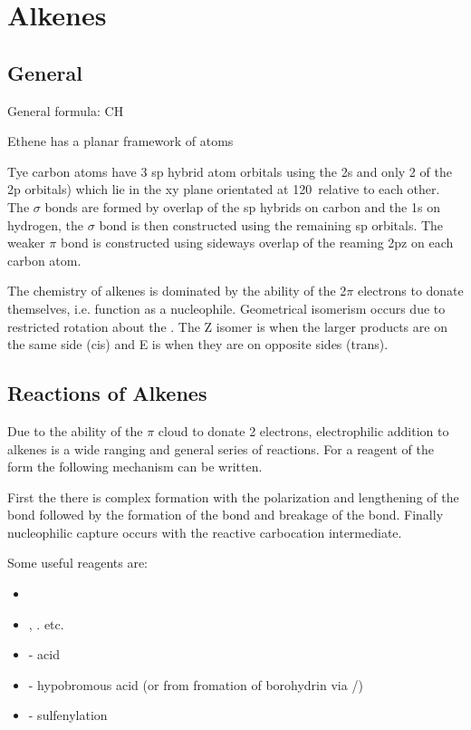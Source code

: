 \section{Alkenes}

\subsection{General}

General formula: CH

Ethene has a planar framework of atoms


Tye carbon atoms have 3 sp hybrid atom orbitals using the 2s and only 2
of the 2p orbitals) which lie in the xy plane orientated at 120\de\ relative to
each other. The  $\sigma$ bonds are formed by overlap of the sp
hybrids on carbon and the 1s on hydrogen, the  $\sigma$ bond is then
constructed using the remaining sp orbitals. The weaker $\pi$ bond
is constructed using sideways overlap of the reaming 2pz on each carbon atom.


The chemistry of alkenes is dominated by the ability of the 2$\pi$ electrons to
donate themselves, i.e. function as a nucleophile. Geometrical isomerism occurs
due to restricted rotation about the . The Z isomer is when the larger
products are on the same side (cis) and E is when they are on opposite sides
(trans).

\subsection{Reactions of Alkenes}

Due to the ability of the $\pi$ cloud to donate 2 electrons, electrophilic addition
to alkenes is a wide ranging and general series of reactions. For a reagent of the
form  the following mechanism can be written.


First the there is complex formation with the polarization and lengthening of the
 bond followed by the formation of the  bond and breakage of
the  bond. Finally nucleophilic capture occurs with the reactive carbocation
intermediate.

Some useful reagents are:
\begin{itemize}
  \item {}
  \item {}, .  etc.
  \item {} - acid
  \item {} - hypobromous acid (or from fromation of borohydrin via
    /)
  \item {} - sulfenylation
\end{itemize}

